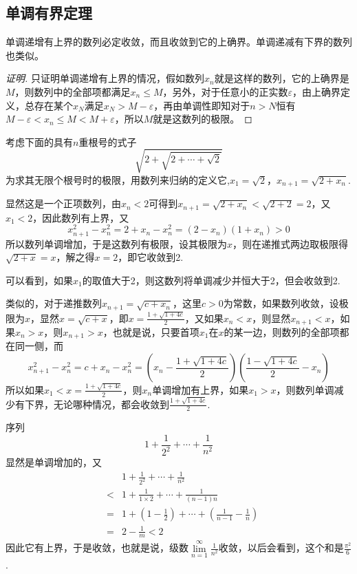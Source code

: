 \subsection{单调有界定理}
\label{sec:theorem-of-monotone-bounded}

\begin{theorem}
  单调递增有上界的数列必定收敛，而且收敛到它的上确界。单调递减有下界的数列也类似。
\end{theorem}

\begin{proof}[证明]
  只证明单调递增有上界的情况，假如数列$x_n$就是这样的数列，它的上确界是$M$，则数列中的全部项都满足$x_n \leqslant M$，另外，对于任意小的正实数$\varepsilon$，由上确界定义，总存在某个$x_N$满足$x_N>M-\varepsilon$，再由单调性即知对于$n>N$恒有$M-\varepsilon < x_n \leqslant M < M+\varepsilon$，所以$M$就是这数列的极限。
\end{proof}

\begin{example}
  考虑下面的具有$n$重根号的式子
  \[ \sqrt{2+\sqrt{2+\cdots+\sqrt{2}}} \]
  为求其无限个根号时的极限，用数列来归纳的定义它,$x_1=\sqrt{2}$，$x_{n+1}=\sqrt{2+x_n}$.

  显然这是一个正项数列，由$x_n<2$可得到$x_{n+1}=\sqrt{2+x_n}<\sqrt{2+2}=2$，又$x_1<2$，因此数列有上界，又
  \[ x_{n+1}^2-x_n^2=2+x_n-x_n^2=(2-x_n)(1+x_n)>0 \]
  所以数列单调增加，于是这数列有极限，设其极限为$x$，则在递推式两边取极限得$\sqrt{2+x}=x$，解之得$x=2$，即它收敛到2.

  可以看到，如果$x_1$的取值大于2，则这数列将单调减少并恒大于2，但会收敛到2.

  类似的，对于递推数列$x_{n+1}=\sqrt{c+x_n}$，这里$c>0$为常数，如果数列收敛，设极限为$x$，显然$x=\sqrt{c+x}$，即$x=\frac{1+\sqrt{1+4c}}{2}$，又如果$x_n<x$，则显然$x_{n+1}<x$，如果$x_n>x$，则$x_{n+1}>x$，也就是说，只要首项$x_1$在$x$的某一边，则数列的全部项都在同一侧，而
  \[ x_{n+1}^2-x_n^2=c+x_n-x_n^2=\left( x_n - \frac{1+\sqrt{1+4c}}{2} \right)\left( \frac{1-\sqrt{1+4c}}{2}-x_n \right) \]
  所以如果$x_1<x=\frac{1+\sqrt{1+4c}}{2}$，则$x_n$单调增加有上界，如果$x_1>x$，则数列单调减少有下界，无论哪种情况，都会收敛到$\frac{1+\sqrt{1+4c}}{2}$.
\end{example}

\begin{example}
  序列
  \[ 1+\frac{1}{2^2}+\cdots+\frac{1}{n^2} \]
  显然是单调增加的，又
  \begin{eqnarray*}
    && 1+\frac{1}{2^2}+\cdots+\frac{1}{n^2} \\
    & < & 1 + \frac{1}{1\times 2}+\cdots+\frac{1}{(n-1)n} \\
    & = & 1+\left( 1-\frac{1}{2} \right)+\cdots+\left( \frac{1}{n-1}-\frac{1}{n} \right) \\
    & = & 2-\frac{1}{m} < 2
  \end{eqnarray*}
  因此它有上界，于是收敛，也就是说，级数$\lim\limits_{n=1}^{\infty}\frac{1}{n^2}$收敛，以后会看到，这个和是$\frac{\pi^2}{6}$.
\end{example}

